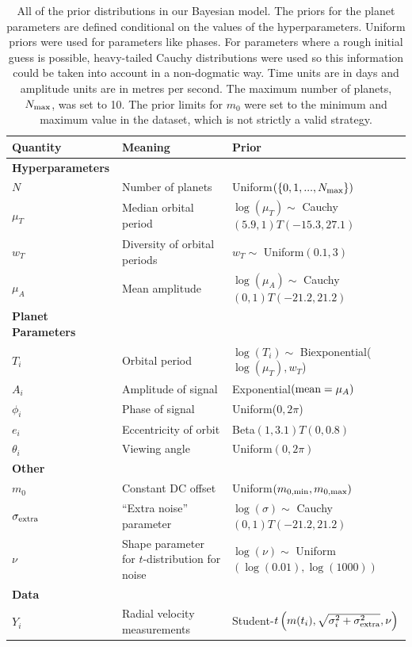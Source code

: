 \documentclass[useAMS,usenatbib]{mn2e}
\begin{document}
\begin{table}
\begin{tabular}{|l|l|l|}
\hline
Quantity	&	Meaning		& Prior\\
\hline
{\bf Hyperparameters}	&	\\
$N$		& Number of planets	& Uniform$(\{0, 1, ..., N_{\rm max}\})$\\
$\mu_T$		&	Median orbital period	& $\log(\mu_T) \sim$ Cauchy$(5.9, 1)T(-15.3, 27.1)$\\
$w_T$		&	Diversity of orbital periods & $w_T \sim$ Uniform$(0.1, 3)$\\
$\mu_A$		&	Mean amplitude	& $\log(\mu_A) \sim$ Cauchy$(0, 1)T(-21.2, 21.2)$\\
\hline
{\bf Planet Parameters}\\
$T_i$		&	Orbital period	&	$\log(T_i) \sim $ Biexponential($\log(\mu_T), w_T$)\\
$A_i$		&	Amplitude of signal	& Exponential$(\textnormal{mean}=\mu_A)$\\
$\phi_i$	&	Phase of signal	&	Uniform($0, 2\pi$)\\
$e_i$		&	Eccentricity of orbit	&	Beta$(1, 3.1)T(0, 0.8)$\\
$\theta_i$	&	Viewing angle	&	Uniform$(0, 2\pi)$\\
\hline
{\bf Other}\\
$m_0$		&	Constant DC offset	&	Uniform$(m_{0, \rm min}, m_{0, \rm max})$\\
$\sigma_{\rm extra}$	& ``Extra noise'' parameter	& $\log(\sigma) \sim$ Cauchy$(0, 1)T(-21.2, 21.2)$\\
$\nu$		& Shape parameter for $t$-distribution for noise & $\log(\nu) \sim$ Uniform$(\log(0.01), \log(1000))$\\
\hline
{\bf Data}\\
$Y_i$		& Radial velocity measurements	&
		Student-$t\left(m(t_i), \sqrt{\sigma_i^2 + \sigma_{\rm extra}^2}, \nu\right)$
\end{tabular}
\caption{All of the prior distributions in our Bayesian model.
The priors for the planet parameters are defined conditional on the values
of the hyperparameters. Uniform priors were used for parameters like phases.
For parameters where a rough initial guess is possible, heavy-tailed Cauchy
distributions were used so this information could be taken into account
in a non-dogmatic way. Time units are in days and amplitude units are
in metres per second. The maximum number of planets, $N_{\rm max}$, was set
to 10. The prior limits for $m_0$ were set to the minimum and maximum value
in the dataset, which is not strictly a valid strategy.\label{tab:priors}}
\end{table}
\end{document}
